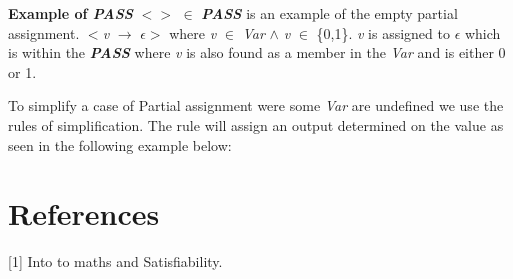\documentclass[11pt,a4paper]{article}
\begin{document}
\textbf{Example of \textbf{\textit{PASS}}}\newline
$<>$ $\in$ \textbf{\textit{PASS}} is an example of the empty partial assignment.\newline
$<$\textit{v} $\rightarrow$ $\epsilon$$>$ where \textit{v} $\in$ \textit{Var} $\land$ \textit{v} $\in$ \{0,1\}. \textit{v} is assigned to $\epsilon$ which is within the \textbf{\textit{PASS}} where \textit{v} is also found as a member in the \textit{Var} and is either 0 or 1. 

To simplify a case of Partial assignment were some \textit{Var} are undefined we use the rules of simplification. The rule will assign an output determined on the value as seen in the following example below: 


\newpage




\section{References}
[1] Into to maths and Satisfiability.  
\end{document}

